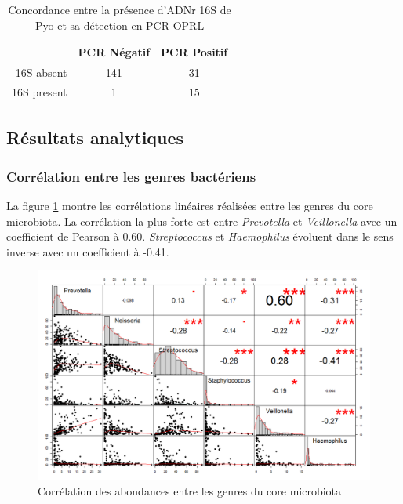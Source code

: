 \documentclass[12pt,a4paper]{article}
\begin{document}
  \begin{table}[h]
      \centering
      \begin{tabular}{r|c|c}
           & PCR Négatif  & PCR Positif \\
           \hline
           16S absent & 141 & 31 \\
           16S present & 1 & 15   \\
           
      \end{tabular}
      \caption{Concordance entre la présence d'ADNr 16S de Pyo et sa détection en PCR OPRL}
      \label{pyopcr}
  \end{table}
 
\subsection{Résultats analytiques}
\subsubsection{Corrélation entre les genres bactériens}
La figure \ref{correlation} montre les corrélations linéaires réalisées entre les genres du core microbiota. La corrélation la plus forte est entre \textit{Prevotella} et \textit{Veillonella} avec un coefficient de Pearson à 0.60.  \textit{Streptococcus} et \textit{Haemophilus} évoluent dans le sens inverse avec un coefficient à -0.41. 
 

\begin{figure}
\begin{center}
\includegraphics[scale=0.50]{img/small_correlation.png}\hfill
\end{center}
\caption{Corrélation des abondances entre les genres du core microbiota}
\label{correlation}
\end{figure}
\end{document}
